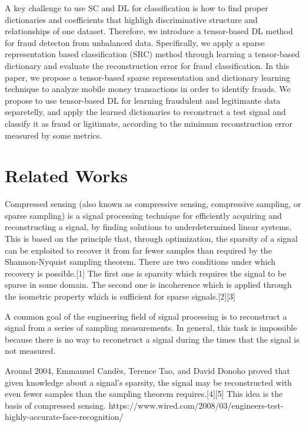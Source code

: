 A key challenge to use SC and DL for classification is how to find proper dictionaries and coefficients that highligh discriminative structure and relationships of one dataset. Therefore, we introduce a tensor-based DL method for fraud detecton from unbalanced data. Specifically, we apply a sparse representation based classification (SRC) method through learning a tensor-based dictionary and evaluate the reconstruction error for fraud classification. In this paper, we propose a tensor-based sparse representation and dictionary learning technique to analyze mobile money transactions in order to identify frauds. We propose to use tensor-based DL for learning fraudulent and legitimante data separetelly, and apply the learned dictionaries to reconstruct a test signal and classify it as fraud or ligitimate, according to the minimum reconstruction error measured by some metrics.


\section{Related Works}
\label{sec:4_relatedworks}

Compressed sensing (also known as compressive sensing, compressive sampling, or sparse sampling) is a signal processing technique for efficiently acquiring and reconstructing a signal, by finding solutions to underdetermined linear systems. This is based on the principle that, through optimization, the sparsity of a signal can be exploited to recover it from far fewer samples than required by the Shannon-Nyquist sampling theorem. There are two conditions under which recovery is possible.[1] The first one is sparsity which requires the signal to be sparse in some domain. The second one is incoherence which is applied through the isometric property which is sufficient for sparse signals.[2][3]

A common goal of the engineering field of signal processing is to reconstruct a signal from a series of sampling measurements. In general, this task is impossible because there is no way to reconstruct a signal during the times that the signal is not measured.

Around 2004, Emmanuel Candès, Terence Tao, and David Donoho proved that given knowledge about a signal's sparsity, the signal may be reconstructed with even fewer samples than the sampling theorem requires.[4][5] This idea is the basis of compressed sensing. 	https://www.wired.com/2008/03/engineers-test-highly-accurate-face-recognition/

